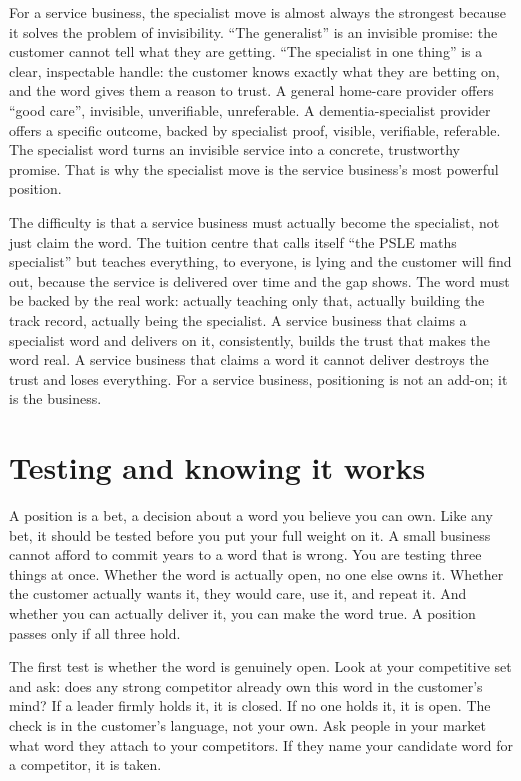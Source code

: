 \documentclass[10pt,twoside,openany]{memoir}
\begin{document}
{For a service business, the specialist move is almost always the
strongest because it solves the problem of invisibility. ``The
generalist'' is an invisible promise: the customer cannot tell what they
are getting. ``The specialist in one thing'' is a clear, inspectable
handle: the customer knows exactly what they are betting on, and the
word gives them a reason to trust. A general home-care provider offers
``good care'', invisible, unverifiable, unreferable. A
dementia-specialist provider offers a specific outcome, backed by
specialist proof, visible, verifiable, referable. The specialist word
turns an invisible service into a concrete, trustworthy promise. That is
why the specialist move is the service business's most powerful
position.

The difficulty is that a service business must actually become the
specialist, not just claim the word. The tuition centre that calls
itself ``the PSLE maths specialist'' but teaches everything, to
everyone, is lying and the customer will find out, because the service
is delivered over time and the gap shows. The word must be backed by the
real work: actually teaching only that, actually building the track
record, actually being the specialist. A service business that claims a
specialist word and delivers on it, consistently, builds the trust that
makes the word real. A service business that claims a word it cannot
deliver destroys the trust and loses everything. For a service business,
positioning is not an add-on; it is the business.

\FloatBarrier
\chapter{Testing and knowing it
works}\label{testing-and-knowing-it-works}

A position is a bet, a decision about a word you believe you can own.
Like any bet, it should be tested before you put your full weight on it.
A small business cannot afford to commit years to a word that is wrong.
You are testing three things at once. Whether the word is actually open,
no one else owns it. Whether the customer actually wants it, they would
care, use it, and repeat it. And whether you can actually deliver it,
you can make the word true. A position passes only if all three hold.

The first test is whether the word is genuinely open. Look at your
competitive set and ask: does any strong competitor already own this
word in the customer's mind? If a leader firmly holds it, it is closed.
If no one holds it, it is open. The check is in the customer's language,
not your own. Ask people in your market what word they attach to your
competitors. If they name your candidate word for a competitor, it is
taken.

}
\end{document}

